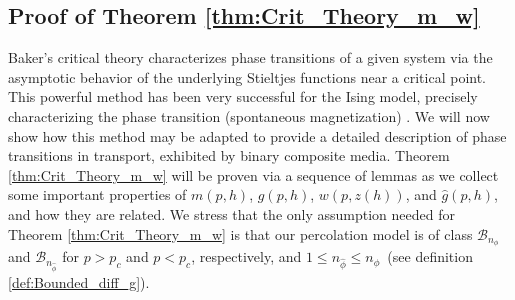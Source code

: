 \documentclass[english,12pt,jmp,graphicx]{revtex4-1}
\newtheorem{definition}{Definition}[section]
\newcommand{\ph}{\hat{\phi}}
\begin{document}
\subsection{Proof of Theorem
  \ref{thm:Crit_Theory_m_w}} \label{sec:Proof_of_Theorem}
%
Baker's critical theory characterizes phase transitions of a given system
via the asymptotic behavior of the underlying Stieltjes functions near a
critical point. This powerful method has been very successful for the
Ising model, precisely characterizing the phase transition
(spontaneous magnetization) \cite{Baker-1990}.
We will now show how this method may be adapted to provide a detailed
description of phase transitions in transport, exhibited by binary
composite media. Theorem \ref{thm:Crit_Theory_m_w} will be proven via
a sequence of lemmas as we collect some important properties of
$m(p,h)$, $g(p,h)$, $w(p,z(h))$, and $\hat{g}(p,h)$, and how they are
related. We stress that the only assumption needed for Theorem
\ref{thm:Crit_Theory_m_w} is that our percolation model is of class
$\mathcal{B}_{n_\phi}$ and $\mathcal{B}_{n_{\ph}}$ for $p>p_c$ and
$p<p_c$, respectively, and $1\leq n_{\ph}\leq n_\phi\,$ (see definition
\ref{def:Bounded_diff_g}). 
%
\end{document}
